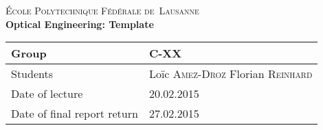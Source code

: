 \begin{titlepage}
\begin{center}
    \textsc{\LARGE École Polytechnique Fédérale de~Lausanne}\\[1.5cm] 
    {\huge \bfseries Optical Engineering: Template}\\[0.4cm] 
    \begin{tabular}{|p{5cm}|p{4cm}|}
        \hline
        Group & C-XX \\ \hline
        Students & Loïc \textsc{Amez-Droz} \newline Florian \textsc{Reinhard} \\ \hline
        Date of lecture & 20.02.2015 \\ \hline
        Date of final report return & 27.02.2015 \\ \hline
    \end{tabular}
\end{center}


\begin{abstract}
    \lipsum[3]
\end{abstract}
 
\vfill
\end{titlepage}
